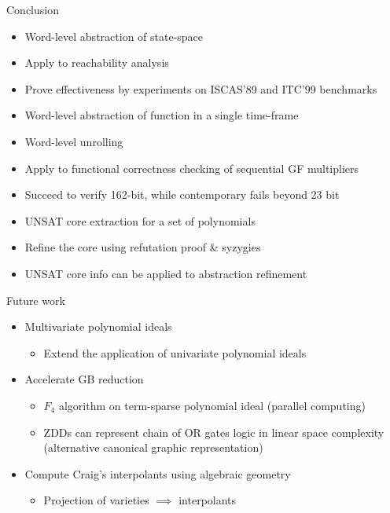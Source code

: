 \documentclass[xcolor=dvipsnames]{beamer}
\newcommand{\bi}{\begin{itemize}}
\newcommand{\ei}{\end{itemize}}
\begin{document}
\begin{frame}{\large{Conclusion}}
\bi
\item Word-level abstraction of state-space
\item Apply to reachability analysis
\item Prove effectiveness by experiments on ISCAS'89 and ITC'99 benchmarks
\ei
\pause
\bi
\item Word-level abstraction of function in a single time-frame
\item Word-level unrolling
\item Apply to functional correctness checking of sequential GF multipliers
\item Succeed to verify 162-bit, while contemporary fails beyond 23 bit 
\ei
\pause
\bi
\item UNSAT core extraction for a set of polynomials
\item Refine the core using refutation proof \& syzygies
\item UNSAT core info can be applied to abstraction refinement
\ei
\end{frame}
\begin{frame}{\large{Future work}}
\bi
\item Multivariate polynomial ideals
	\bi
	\item Extend the application of univariate polynomial ideals
	\ei
\ei
\bi
\item Accelerate GB reduction
	\bi
	\item $F_4$ algorithm on term-sparse polynomial ideal (parallel computing)
	\item ZDDs can represent chain of OR gates logic in linear space complexity (alternative canonical graphic representation)
	\ei
\ei
\bi
\item Compute Craig's interpolants using algebraic geometry
	\bi
	\item Projection of varieties $\implies$ interpolants
	\ei
\ei
\end{frame}
\end{document}
